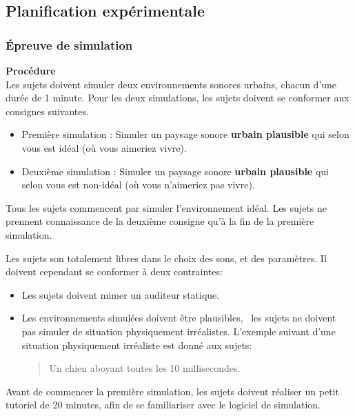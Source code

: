 \subsection{Planification expérimentale}

\subsubsection{Épreuve de simulation}

\textbf{Procédure} \\

Les sujets doivent simuler deux environnements sonores urbains, chacun d'une durée de 1 minute.  Pour les deux simulations, les sujets doivent se conformer aux consignes suivantes.

\begin{itemize}
\item Première simulation : Simuler un paysage sonore \textbf{urbain plausible} qui selon vous est idéal (où vous aimeriez vivre).
\item Deuxième simulation : Simuler un paysage sonore \textbf{urbain plausible} qui selon vous est non-idéal (où vous n'aimeriez pas vivre).
\end{itemize}

Tous les sujets commencent par simuler l'environnement idéal. Les sujets ne prennent connaissance de la deuxième consigne qu'à la fin de la première simulation.

Les sujets son totalement libres dans le choix des sons, et des paramètres. Il doivent cependant se conformer à deux contraintes:

\begin{itemize}

\item Les sujets doivent mimer un auditeur statique.
 
\item Les environnements simulées doivent être plausibles, \ie~les sujets ne doivent pas simuler de situation physiquement irréalistes. L'exemple suivant d'une situation physiquement irréaliste est donné aux sujets: 

\begin{quote}
Un chien aboyant toutes les 10 millisecondes.
\end{quote}

\end{itemize}

Avant de commencer la première simulation, les sujets doivent réaliser un petit tutoriel de 20 minutes, afin de se familiariser avec le logiciel de simulation.

